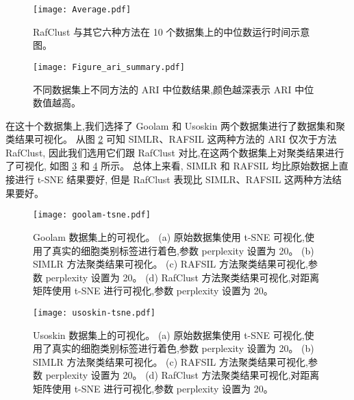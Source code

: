   \begin{figure}[!htbp]
    \centering
    \texttt{[image: Average.pdf]}
    \caption{
    RafClust 与其它六种方法在 10 个数据集上的中位数运行时间示意图。
    }
    \label{fig:running-summary}
\end{figure}

\begin{figure}[!htbp]
    \centering
    \texttt{[image: Figure\_ari\_summary.pdf]}
    \caption{
    不同数据集上不同方法的 ARI 中位数结果,颜色越深表示 ARI 中位数值越高。
    }
    \label{fig:rafari}
\end{figure}

在这十个数据集上,我们选择了 Goolam 和 Usoskin 两个数据集进行了数据集和聚类结果可视化。
从图 \ref{fig:rafari} 可知 SIMLR、RAFSIL 这两种方法的 ARI 仅次于方法 RafClust,
因此我们选用它们跟 RafClust 对比,在这两个数据集上对聚类结果进行了可视化, 
如图 \ref{fig:goolam-tsne} 和 \ref{fig:usoskin-tsne} 所示。
总体上来看, SIMLR 和 RAFSIL 均比原始数据上直接进行 t-SNE 结果要好,
但是 RafClust 表现比 SIMLR、RAFSIL 这两种方法结果要好。

\begin{figure}[!htbp]
  \centering
  \texttt{[image: goolam-tsne.pdf]}
  \caption{
  Goolam 数据集上的可视化。
  (a) 原始数据集使用 t-SNE 可视化,使用了真实的细胞类别标签进行着色,参数 perplexity 设置为 20。
  (b)  SIMLR 方法聚类结果可视化。
  (c)  RAFSIL 方法聚类结果可视化,参数 perplexity 设置为 20。
  (d)  RafClust 方法聚类结果可视化,对距离矩阵使用 t-SNE 进行可视化,参数 perplexity 设置为 20。
  }
  \label{fig:goolam-tsne}
\end{figure}


\begin{figure}[!htbp]
  \centering
  \texttt{[image: usoskin-tsne.pdf]}
  \caption{
  Usoskin 数据集上的可视化。
  (a) 原始数据集使用 t-SNE 可视化,使用了真实的细胞类别标签进行着色,参数 perplexity 设置为 20。
  (b)  SIMLR 方法聚类结果可视化。
  (c)  RAFSIL 方法聚类结果可视化,参数 perplexity 设置为 20。
  (d)  RafClust 方法聚类结果可视化,对距离矩阵使用 t-SNE 进行可视化,参数 perplexity 设置为 20。
  }
  \label{fig:usoskin-tsne}
\end{figure}



